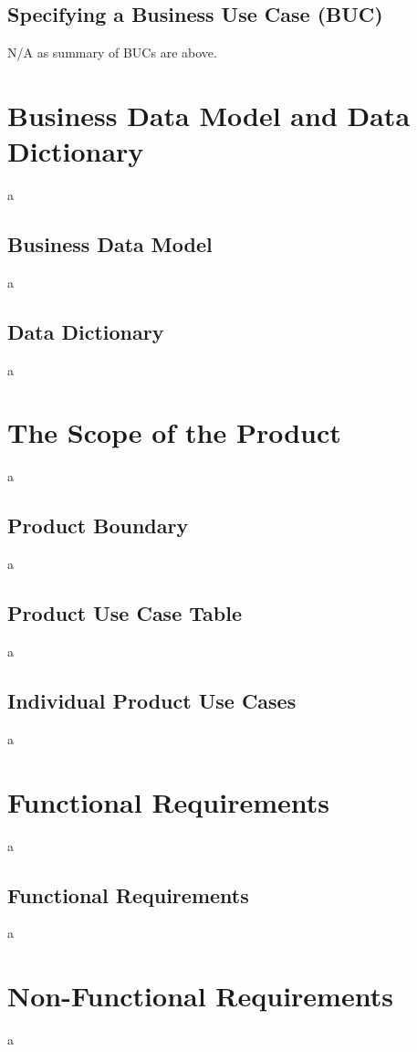 \documentclass[12pt]{article}
\begin{document}
\subsection{Specifying a Business Use Case (BUC)}
N/A as summary of BUCs are above.

\section{Business Data Model and Data Dictionary}
a

\subsection{Business Data Model}
a

\subsection{Data Dictionary}
a

\section{The Scope of the Product}
a

\subsection{Product Boundary}
a

\subsection{Product Use Case Table}
a

\subsection{Individual Product Use Cases}
a

\section{Functional Requirements}
a

\subsection{Functional Requirements}
a

\section{Non-Functional Requirements}
a
\end{document}

